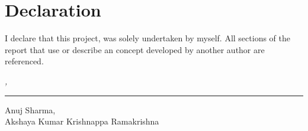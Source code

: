 %
\chapter*{Declaration}
\label{sec:declaration}
\thispagestyle{empty}

I declare that this project, was solely undertaken by myself. All sections of the report that use or describe an concept developed by another author are referenced. 

\bigskip

\noindent\textit{\thesisUniversityCity, \thesisDate}

\smallskip

\begin{flushright}
	\begin{minipage}{8cm}
		\rule{\textwidth}{1pt}
		\centering Anuj Sharma, \\Akshaya Kumar Krishnappa Ramakrishna
	\end{minipage}
\end{flushright}


